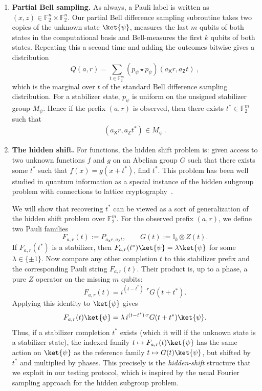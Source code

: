 \documentclass[11pt]{article}
\newcommand{\id}{\ensuremath{\mathbb{I}}}
\newcommand{\Z}{\mathsf{Z}}
\newcommand{\X}{\mathsf{X}}
\newcommand{\F}{\mathbb{F}}
\begin{document}
\begin{enumerate}
\item \textbf{Partial Bell sampling.}
As always, a Pauli label is written as $(x,z)\in\F_2^n\times\F_2^n$. Our partial Bell difference sampling subroutine takes two copies of the unknown state $\ket{\psi}$, measures the
last $m$ qubits of both states in the computational basis and Bell-measures the first $k$ qubits of both states. Repeating this a second time and adding the outcomes bitwise gives a distribution
$$
    Q(a,r)
    =
    \sum_{t\in\F_2^m}
    (p_\psi\star p_\psi)(a_\X r, a_\Z t) \ ,
$$
which is the marginal over $t$ of the standard Bell difference sampling distribution.
For a stabilizer state, $p_\psi$ is uniform on the unsigned stabilizer group
$M_\psi$.  Hence if the prefix $(a,r)$ is observed, then there exists $t^* \in \F_{2}^m$ such that 
\begin{align}
    (a_\X r, a_\Z t^*) \in M_\psi\ .
\end{align}

\item \textbf{The hidden shift.}
For functions, the hidden shift problem is: given access to two unknown functions $f$ and $g$ on an Abelian group $G$ such that there exists some $t^*$ such that $f(x) = g(x+t^*)$, find $t^*$. This problem has been well studied in quantum information as a special instance of the hidden subgroup problem with connections to lattice cryptography~\cite{van2006quantum, childs2010quantum, regev2004quantum, kuperberg2005subexponential,rotteler2010quantum,simon1997power}. 

We will show that recovering $t^*$ can be viewed as a sort of generalization of the hidden shift problem over $\F_2^m$. For the observed prefix $(a,r)$, we define two Pauli families
$$
    F_{a,r}(t):=P_{a_\X r, a_\Z  t},
    \qquad
    G(t):=\id_k\otimes Z(t).
$$
If $F_{a,r}(t^*)$ is a stabilizer, then
$F_{a,r}(t^\ast)\ket{\psi}=\lambda\ket{\psi}$ for some
$\lambda\in\{\pm1\}$. Now compare any other completion $t$ to this stabilizer
prefix and the corresponding Pauli string $F_{a,r}(t)$.  Their product is, up to a phase,
a pure $Z$ operator on the missing $m$ qubits:
$$
    F_{a,r}(t)
    =
    i^{(t-t^\ast)\cdot r}
    G(t+t^\ast).
$$
Applying this identity to $\ket{\psi}$ gives
$$
    F_{a,r}(t)\ket{\psi}
    =
    \lambda\, i^{(t-t^\ast)\cdot r}
    G(t+t^\ast)\ket{\psi}.
$$
Thus, if a stabilizer completion $t^\ast$ exists (which it will if the unknown state is a stabilizer state), the indexed family
$t\mapsto F_{a,r}(t)\ket{\psi}$ has the same action on $\ket{\psi}$ as the reference family
$t\mapsto G(t)\ket{\psi}$, but shifted by $t^\ast$ and multiplied by
phases. This precisely is the \emph{hidden-shift} structure that we exploit in our testing protocol, which is inspired by the usual Fourier sampling approach for the hidden subgroup problem.


\end{enumerate}
\end{document}
